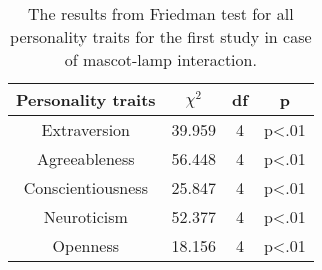\begin{table}[H]
    \renewcommand{\arraystretch}{1}
    \begin{center}
        \begin{tabular}{|c|c|c|c|}
            \hline
            \textbf{Personality traits} & \textbf{$\chi^2$} & \textbf{df} & \textbf{p} \\
            \hline
            Extraversion &39.959 &4 & p<.01 \\
            \hline
            Agreeableness &56.448 &4 & p<.01 \\
            \hline
            Conscientiousness &25.847 &4 & p<.01\\
            \hline
            Neuroticism &52.377 &4 & p<.01 \\
            \hline
            Openness &18.156 &4 & p<.01 \\
            \hline
        \end{tabular}
        \caption{The results from Friedman test for all personality traits for the first study
        in case of mascot-lamp interaction.}
        \label{table:friedmanML1}
    \end{center}
\end{table}

